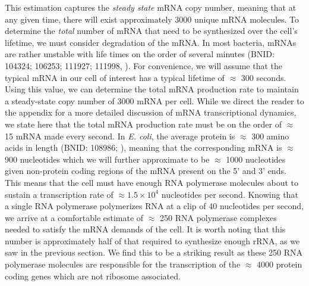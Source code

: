 This estimation captures the \textit{steady state} mRNA copy number, meaning
that at any given time, there will exist approximately 3000 unique mRNA
molecules. To determine the \textit{total} number of mRNA that need to be
synthesized over the cell's lifetime, we must consider degradation of the
mRNA. In most bacteria, mRNAs are rather unstable with life times on the order
of several minutes (BNID: 104324; 106253; 111927; 111998,
\cite{milo2010}). For convenience, we will assume that the typical mRNA in our
cell of interest has a typical lifetime of $\approx$ 300 seconds. Using this
value, we can determine the total mRNA production rate to maintain a
steady-state copy number of 3000 mRNA per cell. While we direct the reader to
the appendix for a more detailed discussion of mRNA transcriptional dynamics, we
state here that the total mRNA production rate must be on the order of $\approx$ 15 mRNA made every second.  
In \textit{E. coli}, the average protein is $\approx$ 300 amino acids in length (BNID:
108986; \cite{milo2010}), meaning that the corresponding mRNA is $\approx$
900 nucleotides which we will further approximate to be $\approx$ 1000
nucleotides given non-protein coding regions of the mRNA present on the 5'
and 3' ends. This means that the cell must have enough RNA polymerase molecules
about to sustain a transcription rate of $\approx 1.5 \times 10^4$ nucleotides
per second. Knowing that a single RNA polymerase polymerizes RNA at a clip of 40
nucleotides per second, we arrive at a comfortable estimate of $\approx$ 250 RNA
polymerase complexes needed to satisfy the mRNA demands of the cell. It is worth
noting that this number is approximately half of that required to synthesize
enough rRNA, as we saw in the previous section. We find this to be a striking
result as these 250 RNA polymerase molecules are responsible for the
transcription of the $\approx$ 4000 protein coding genes which are not ribosome
associated. 

